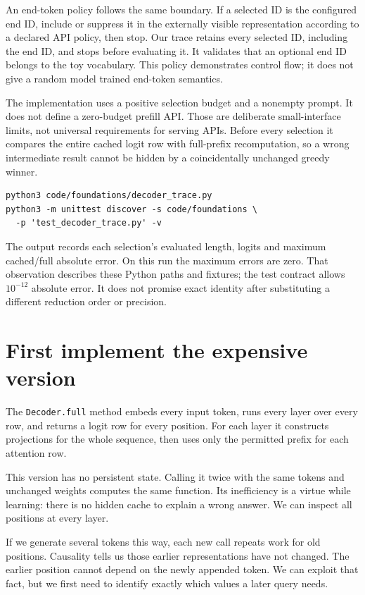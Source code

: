 An end-token policy follows the same boundary. If a selected ID is the
configured end ID, include or suppress it in the externally visible
representation according to a declared API policy, then stop. Our trace
retains every selected ID, including the end ID, and stops before
evaluating it. It validates that an optional end ID belongs to the toy
vocabulary. This policy demonstrates control flow; it does not give a
random model trained end-token semantics.

The implementation uses a positive selection budget and a nonempty
prompt. It does not define a zero-budget prefill API. Those are deliberate
small-interface limits, not universal requirements for serving APIs.
Before every selection it compares the entire cached logit row with
full-prefix recomputation, so a wrong intermediate result cannot be
hidden by a coincidentally unchanged greedy winner.

\begin{verbatim}
python3 code/foundations/decoder_trace.py
python3 -m unittest discover -s code/foundations \
  -p 'test_decoder_trace.py' -v
\end{verbatim}
The output records each selection's evaluated length, logits and maximum
cached/full absolute error. On this run the maximum errors are zero.
That observation describes these Python paths and fixtures; the test
contract allows $10^{-12}$ absolute error. It does not promise exact
identity after substituting a different reduction order or precision.
\begin{minipage}{\linewidth}
\end{minipage}

\section{First implement the expensive version}
The \texttt{Decoder.full} method embeds every input token, runs every
layer over every row, and returns a logit row for every position.
For each layer it constructs projections for the whole sequence, then
uses only the permitted prefix for each attention row.

This version has no persistent state. Calling it twice with the same
tokens and unchanged weights computes the same function. Its inefficiency
is a virtue while learning: there is no hidden cache to explain a wrong
answer. We can inspect all positions at every layer.

If we generate several tokens this way, each new call repeats work for
old positions. Causality tells us those earlier representations have not
changed. The earlier position cannot depend on the newly appended token.
We can exploit that fact, but we first need to identify exactly which
values a later query needs.

